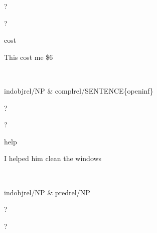 \begin{thetadescr}
\evitem ?
\esitem
     \begin{examples}
        \example ?
     \end{examples}
\end{thetadescr}



\begin{thetadescr}
\evitem cost
\esitem
     \begin{examples}
        \example This cost me \$6
     \end{examples}
\end{thetadescr}


\newpage
{}
\begin{vpattern}
 \norule
\csritem \mbox{}\\
     \begin{csr}
      indobjrel/NP & complrel/SENTENCE\{openinf\}
     \end{csr}
\remarksitem
\end{vpattern}


\begin{thetadescr}
\evitem ?
\esitem
     \begin{examples}
        \example ?
     \end{examples}
\end{thetadescr}



\begin{thetadescr}
\evitem help
\esitem
     \begin{examples}
        \example I helped him clean the windows
     \end{examples}
\end{thetadescr}


\newpage
{}
\begin{vpattern}
 \norule
\csritem \mbox{}\\
     \begin{csr}
      indobjrel/NP & predrel/NP
     \end{csr}
\remarksitem
\end{vpattern}


\begin{thetadescr}
\evitem ?
\esitem
     \begin{examples}
        \example ?
     \end{examples}
\end{thetadescr}


